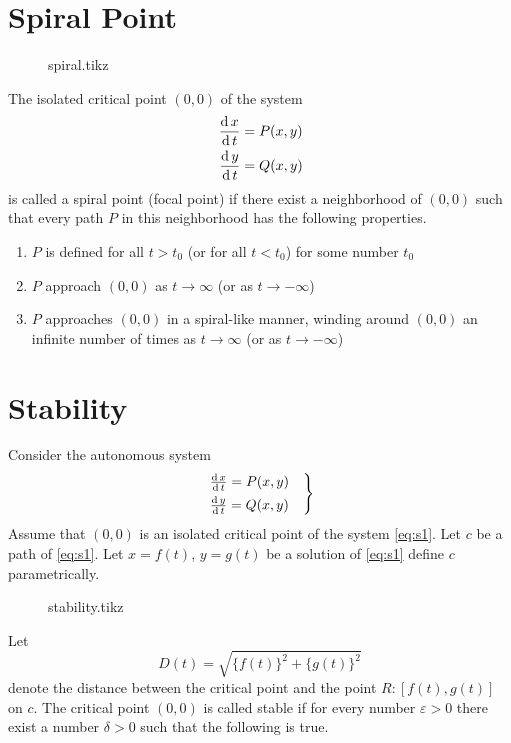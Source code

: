 \documentclass[../main-sheet.tex]{subfiles}
\begin{document}
\section{Spiral Point}
\begin{figure}[H]
    \centering
    {spiral.tikz}
\end{figure}
The isolated critical point \((0,0)\) of the system
\begin{align*}
    \,\frac{\mathrm{d}\,x}{\mathrm{d}\,t}&=P(x,y)\\
    \,\frac{\mathrm{d}\,y}{\mathrm{d}\,t}&=Q(x,y)
\end{align*}
is called a spiral point (focal point) if there exist a neighborhood of \((0,0)\) such that every path \(P\) in this neighborhood has the following properties.
\begin{enumerate}[label=(\roman*)]
    \item \(P\) is defined for all \(t>t_0\) (or for all \(t<t_0\)) for some number \(t_0\)
    \item \(P\) approach \((0,0)\) as \(t\to\infty\) (or as \(t\to-\infty\))
    \item \(P\) approaches \((0,0)\) in a spiral-like manner, winding around \((0,0)\) an infinite number of times as \(t\to \infty\) (or as \(t\to-\infty\))
\end{enumerate}
\section{Stability}
Consider the autonomous system
\begin{equation}
    \begin{rcases}
        \,\frac{\mathrm{d}\,x}{\mathrm{d}\,t}=P(x,y)\quad\\
    \,\frac{\mathrm{d}\,y}{\mathrm{d}\,t}=Q(x,y)   
    \end{rcases}
    \label{eq:s1}
\end{equation}
Assume that \((0,0)\) is an isolated critical point of the system \eqref{eq:s1}. Let \(c\) be a path of \eqref{eq:s1}. Let \(x=f(t)\), \(y=g(t)\) be a solution of \eqref{eq:s1} define \(c\) parametrically.

\begin{figure}[H]
    \centering
    {stability.tikz}
\end{figure}

Let
\begin{equation}
    D(t)=\sqrt{\{f(t)\}^2+\{g(t)\}^2}\label{eq:s2}
\end{equation}
denote the distance between the critical point and the point \(R:[f(t),g(t)]\) on \(c\). The critical point \((0,0)\) is called stable if for every number \(\varepsilon>0\) there exist a number \(\delta>0\) such that the following is true.
\end{document}
